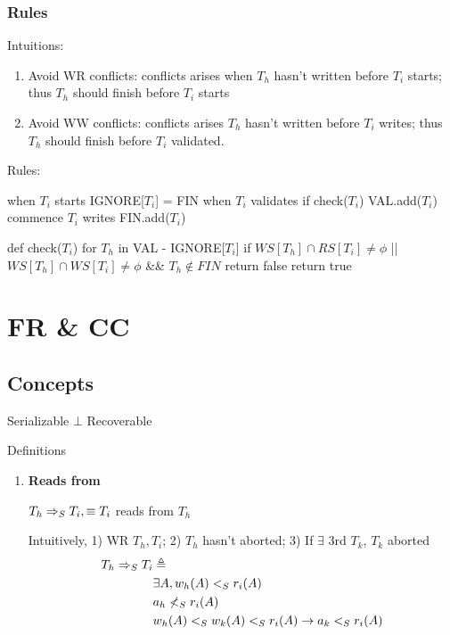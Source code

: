 \documentclass[a4paper]{report}
\begin{document}
\subsection{Rules}
Intuitions: 
\begin{enumerate}
\item Avoid WR conflicts: conflicts arises when $T_h$ hasn't written before $T_i$ starts; thus $T_h$ should finish before $T_i$ starts 
\item Avoid WW conflicts: conflicts arises $T_h$ hasn't written before $T_i$ writes; thus $T_h$ should finish before $T_i$ validated. 
\end{enumerate}
Rules:
\begin{pseudo}
when $T_i$ starts
  IGNORE[$T_i$] = FIN
when $T_i$ validates 
  if check($T_i$)
    VAL.add($T_i$)
    commence $T_i$ writes 
    FIN.add($T_i$)
        
def check($T_i$)
  for $T_h$ in VAL - IGNORE[$T_i$]
    if $WS[T_h]\cap RS[T_i] \neq \phi$ || $WS[T_h]\cap WS[T_i] \neq \phi$ && $T_h \notin FIN$
      return false
  return true
  
\end{pseudo}
\chapter{FR \& CC}
\section{Concepts}
Serializable $\bot$ Recoverable 

Definitions
\begin{enumerate}
\item \textbf{Reads from}

$T_h \Rightarrow_S T_i, \equiv T_i$ reads from $T_h$

Intuitively, 1) WR $T_h, T_i$; 2) $T_h$ hasn't aborted; 3) If $\exists$ 3rd $T_k$, $T_k$ aborted
\begin{align*}
T_h \Rightarrow_S T_i &\triangleq \\
& \exists A, w_h(A) <_S r_i(A) \\
& a_h \nless_S r_i(A) \\
& w_h(A) <_S w_k(A) <_S r_i(A) \rightarrow a_k <_S r_i(A)
\end{align*}



\end{enumerate}
\end{document}
